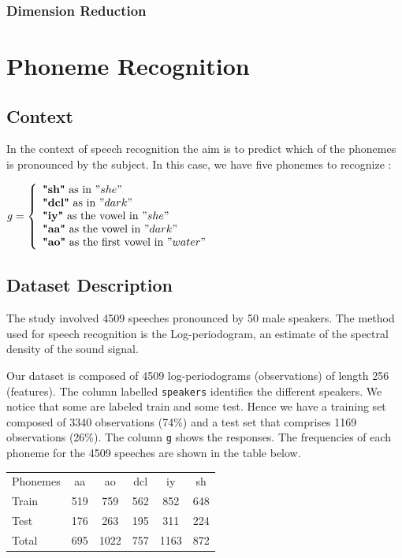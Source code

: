 \documentclass[]{report}
\begin{document}
\subsection{Dimension Reduction}



\chapter{Phoneme Recognition}
\section{Context}
In the context of speech recognition the aim is to predict which of the phonemes is pronounced by the subject. In this case, we have five phonemes to recognize :\\ 
\begin{center}
	$g = \left\{
	\begin{array}{l}
	\textbf{"sh"} \text{ as in } "she" \\
	\textbf{"dcl"} \text{ as in } "dark" \\
	\textbf{"iy"} \text{ as the vowel in } "she" \\ 
	\textbf{"aa"} \text{ as the vowel in }  "dark"\\
	\textbf{"ao"} \text{ as the first vowel in }  "water"
	\end{array}
	\right.$
\end{center}

\section{Dataset Description}

The study involved 4509 speeches pronounced by 50 male speakers. The method used for speech recognition is the Log-periodogram, an estimate of the spectral density of the sound signal.

Our dataset is composed of 4509 log-periodograms (observations) of length 256 (features). The column labelled \texttt{speakers} identifies the different speakers. We notice that some are labeled train and some test. Hence we have a training set composed of 3340 observations (74\%) and a test set that comprises 1169 observations (26\%). The column \texttt{g} shows the responses. The frequencies of each phoneme for the 4509 speeches are shown in the table below.

\begin{center}
\begin{tabular}{l c c c c c}
 Phonemes	 & aa &  ao & dcl & iy & sh \\
Train & 519 & 759 & 562 & 852 & 648\\
Test  & 176 & 263 & 195 & 311 & 224\\
Total & 695 & 1022 & 757 & 1163 & 872
\end{tabular}
\end{center}
\end{document}
